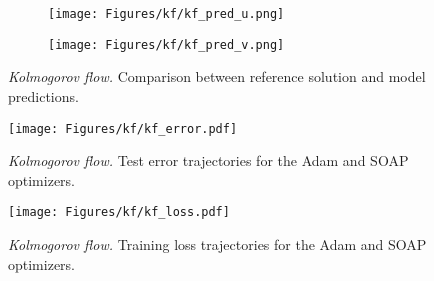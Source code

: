 


\begin{figure}
  \centering
  \begin{subfigure}[b]{0.45\textwidth}
    \texttt{[image: Figures/kf/kf\_pred\_u.png]}
  \end{subfigure}
  \hspace{2mm}
  \begin{subfigure}[b]{0.45\textwidth}
    \texttt{[image: Figures/kf/kf\_pred\_v.png]}
  \end{subfigure}
\caption{{\em Kolmogorov flow.} Comparison between reference solution and model predictions.}
  \label{fig:ns_tori_uv_preds}
\end{figure}



\begin{figure}
    \centering
    \texttt{[image: Figures/kf/kf\_error.pdf]}
 \caption{{\em Kolmogorov flow.} Test error trajectories for the Adam and SOAP optimizers.}
    \label{fig:ns_tori_error}
\end{figure}

\begin{figure}
    \centering
    \texttt{[image: Figures/kf/kf\_loss.pdf]}
 \caption{{\em Kolmogorov flow.} Training loss trajectories for the Adam and SOAP optimizers.}
    \label{fig:ns_tori_loss}
\end{figure}



